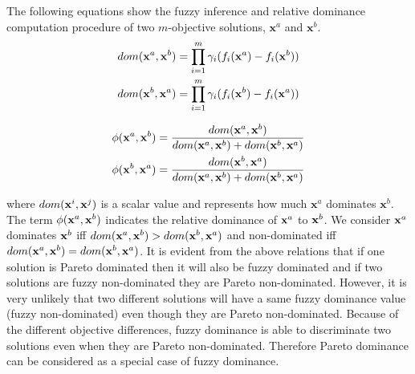 \documentclass[review]{elsarticle}
\makeatletter
\newcommand{\thickhline}{%
	\noalign {\ifnum 0=`}\fi \hrule height 1pt
	\futurelet \reserved@a \@xhline
}
\makeatother
\begin{document}

The following equations show the fuzzy inference and relative dominance computation procedure of two $m$-objective solutions, $\textbf{x}^a$ and $\textbf{x}^b$.
\begin{align}
	 dom({\bf x}^a, {\bf x}^b) = \prod^{m}_{i=1} \gamma_i(f_i({\bf x}^a)-f_i({\bf x}^b))\label{eq:domi1}\\
	 dom({\bf x}^b, {\bf x}^a) = \prod^{m}_{i=1} \gamma_i(f_i({\bf x}^b)-f_i({\bf x}^a))\label{eq:domi2}
\end{align}

\begin{eqnarray}
\phi({\bf x}^a, {\bf x}^b)=\frac{dom({\bf x}^a, {\bf x}^b)}{dom({\bf x}^a, {\bf x}^b) + dom({\bf x}^b, {\bf x}^a)}\label{eq:re-domi1} \\
\phi({\bf x}^b, {\bf x}^a)=\frac{dom({\bf x}^b, {\bf x}^a)}{dom({\bf x}^a, {\bf x}^b) + dom({\bf x}^b, {\bf x}^a)}\label{eq:re-domi2}
\end{eqnarray}

\noindent where  $dom({\bf x}^i, {\bf x}^j)$ is  a scalar value and represents  how much $\textbf{x}^a$ dominates 
$\textbf{x}^b$. The term  $\phi({\bf x}^a, {\bf x}^b)$ indicates the relative dominance of ${\bf x}^a$ to ${\bf x}^b$. We consider ${\bf x}^a$ dominates ${\bf x}^b$ iff $dom({\bf x}^a, {\bf x}^b) > dom({\bf x}^b, {\bf x}^a)$ and non-dominated iff $dom({\bf x}^a, {\bf x}^b) = dom({\bf x}^b, {\bf x}^a)$.
It is evident from the above relations that if one solution is Pareto dominated then it  will also be fuzzy dominated and if two solutions are fuzzy non-dominated they are Pareto non-dominated. 
However, it is very unlikely that two different solutions will have a same fuzzy dominance value (fuzzy non-dominated) even though they are Pareto non-dominated. Because of the different objective differences, fuzzy dominance is able to discriminate two solutions even when they are Pareto non-dominated. Therefore Pareto dominance can be considered as a special case of fuzzy dominance.
  
\end{document}
